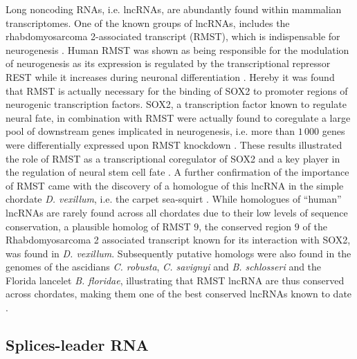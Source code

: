 \documentclass[graybox]{svmult}
\begin{document}
Long noncoding RNAs, i.e. lncRNAs, are abundantly found within mammalian 
transcriptomes. One of the known groups of lncRNAs, includes the 
rhabdomyosarcoma 2-associated transcript (RMST), which is indispensable for 
neurogenesis \cite{Bogu2013}. 
Human RMST was shown as being responsible for the modulation of neurogenesis as 
its expression is regulated by the transcriptional repressor REST while it 
increases during neuronal differentiation \cite{Bogu2013}. Hereby it was 
found that RMST is actually necessary for the binding of SOX2 to promoter 
regions of neurogenic transcription factors. SOX2, a transcription factor known 
to regulate neural fate, in combination with RMST were actually found to 
coregulate a large pool of downstream genes implicated in neurogenesis, i.e. 
more than $1\,000$ genes were differentially expressed upon RMST knockdown 
\cite{Bogu2013}. These results illustrated the role of RMST as a 
transcriptional coregulator of SOX2 and a key player in the regulation of 
neural stem cell fate \cite{Bogu2013}. A further confirmation of the importance 
of RMST came with the discovery of a homologue of this lncRNA in the simple 
chordate \textit{D. vexillum}, i.e. the carpet sea-squirt 
\cite{Velandia-Huerto2016}. While homologues of ``human'' lncRNAs are 
rarely found across all chordates due to their low levels of sequence 
conservation, a plausible homolog of RMST $9$, the conserved region $9$ of the 
Rhabdomyosarcoma 2 associated transcript known for its interaction with SOX2, 
was found in \textit{D. vexillum}. Subsequently putative homologs were also 
found in the genomes of the ascidians \textit{C. robusta}, \textit{C. 
savignyi} and \textit{B. schlosseri} and the Florida lancelet \textit{B. 
floridae}, illustrating that RMST lncRNA are thus conserved across chordates, 
making them one of the best conserved lncRNAs known to date 
\cite{Velandia-Huerto2016}.

\subsection{Splices-leader RNA}
\end{document}

